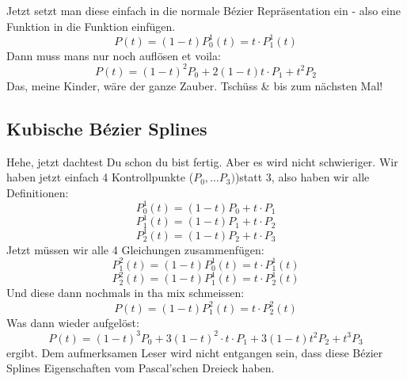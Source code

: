 Jetzt setzt man diese einfach in die normale Bézier Repräsentation ein - also eine Funktion in die Funktion einfügen.
\begin{displaymath}
P(t) = (1-t)P^1_0(t) = t\cdot P^1_1(t)
\end{displaymath}
Dann muss mans nur noch auflösen et voila:
\begin{displaymath}
P(t) = (1-t)^2P_0 + 2(1-t)t\cdot P_1+t^2P_2
\end{displaymath}
Das, meine Kinder, wäre der ganze Zauber. Tschüss \& bis zum nächsten Mal!

\subsection{Kubische Bézier Splines}
Hehe, jetzt dachtest Du schon du bist fertig. Aber es wird nicht schwieriger. Wir haben jetzt einfach 4 Kontrollpunkte (\(P_0, \dots P_3)\))statt 3, also haben wir alle Definitionen:
\begin{displaymath}
P^1_0(t) = (1-t)P_0 + t\cdot P_1
\end{displaymath}
\begin{displaymath}
P^1_1(t) = (1-t)P_1 + t\cdot P_2
\end{displaymath}
\begin{displaymath}
P^1_2(t) = (1-t)P_2 + t\cdot P_3
\end{displaymath}
Jetzt müssen wir alle 4 Gleichungen zusammenfügen:
\begin{displaymath}
P^2_1(t) = (1-t)P^1_0(t) = t\cdot P^1_1(t)
\end{displaymath}
\begin{displaymath}
P^2_2(t) = (1-t)P^1_1(t) = t\cdot P^1_2(t)
\end{displaymath}
Und diese dann nochmals in tha mix schmeissen:
\begin{displaymath}
P(t) = (1-t)P^2_1(t) = t\cdot P^2_2(t)
\end{displaymath}
Was dann wieder aufgelöst:
\begin{displaymath}
P(t) = (1-t)^3P_0+3(1-t)^2\cdot t\cdot P_1+3(1-t)t^2P_2+t^3P_3
\end{displaymath}
ergibt. Dem aufmerksamen Leser wird nicht entgangen sein, dass diese Bézier Splines Eigenschaften vom Pascal'schen Dreieck haben.


